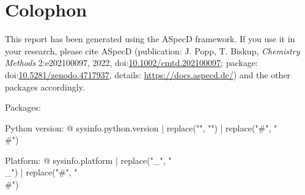 \section*{Colophon}

This report has been generated using the ASpecD framework. If you use it in your research, please cite ASpecD (publication: J. Popp, T. Biskup, \emph{Chemistry Methods} 2:e202100097, 2022, doi:\href{https://doi.org/10.1002/cmtd.202100097}{10.1002/cmtd.202100097}; package: doi:\href{https://doi.org/10.5281/zenodo.4717937}{10.5281/zenodo.4717937}, details: \url{https://docs.aspecd.de/}) and the other packages accordingly.

Packages: %


Python version: {@ sysinfo.python.version | replace("\n", "") | replace("#", "\\#") }

Platform: {@ sysinfo.platform | replace("_", "\\_") | replace("#", "\\#") }
